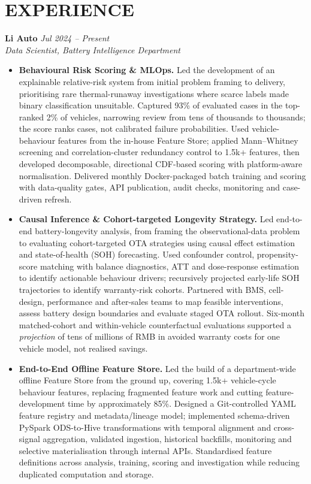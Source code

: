 \documentclass[a4paper,10pt]{article}
\begin{document}
\section{EXPERIENCE}
\textbf{Li Auto} \hfill \textit{Jul 2024 -- Present}\\
\textit{Data Scientist, Battery Intelligence Department}
\begin{itemize}
\item \textbf{Behavioural Risk Scoring \& MLOps.} Led the development of an explainable relative-risk system from initial problem framing to delivery, prioritising rare thermal-runaway investigations where scarce labels made binary classification unsuitable. Captured 93\% of evaluated cases in the top-ranked 2\% of vehicles, narrowing review from tens of thousands to thousands; the score ranks cases, not calibrated failure probabilities. Used vehicle-behaviour features from the in-house Feature Store; applied Mann--Whitney screening and correlation-cluster redundancy control to 1.5k+ features, then developed decomposable, directional CDF-based scoring with platform-aware normalisation. Delivered monthly Docker-packaged batch training and scoring with data-quality gates, API publication, audit checks, monitoring and case-driven refresh.
\item \textbf{Causal Inference \& Cohort-targeted Longevity Strategy.} Led end-to-end battery-longevity analysis, from framing the observational-data problem to evaluating cohort-targeted OTA strategies using causal effect estimation and state-of-health (SOH) forecasting. Used confounder control, propensity-score matching with balance diagnostics, ATT and dose-response estimation to identify actionable behaviour drivers; recursively projected early-life SOH trajectories to identify warranty-risk cohorts. Partnered with BMS, cell-design, performance and after-sales teams to map feasible interventions, assess battery design boundaries and evaluate staged OTA rollout. Six-month matched-cohort and within-vehicle counterfactual evaluations supported a \emph{projection} of tens of millions of RMB in avoided warranty costs for one vehicle model, not realised savings.
\item \textbf{End-to-End Offline Feature Store.} Led the build of a department-wide offline Feature Store from the ground up, covering 1.5k+ vehicle-cycle behaviour features, replacing fragmented feature work and cutting feature-development time by approximately 85\%. Designed a Git-controlled YAML feature registry and metadata/lineage model; implemented schema-driven PySpark ODS-to-Hive transformations with temporal alignment and cross-signal aggregation, validated ingestion, historical backfills, monitoring and selective materialisation through internal APIs. Standardised feature definitions across analysis, training, scoring and investigation while reducing duplicated computation and storage.

\end{itemize}
\end{document}
